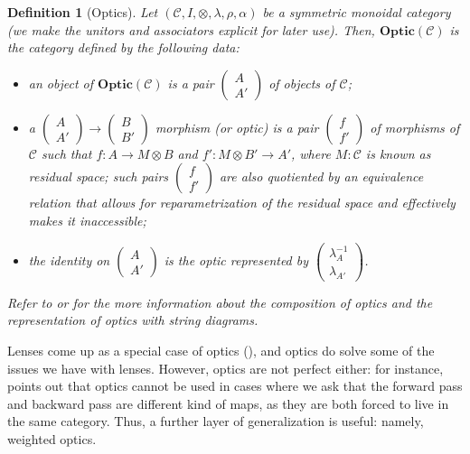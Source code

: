 \documentclass[11pt,a4paper,openright,twoside]{report}
\newcounter{mycounter}
\theoremstyle{plain}
\newtheorem{definition}[mycounter]{Definition}
\theoremstyle{definition}
\begin{document}
\begin{definition}[Optics]
  Let $(\mathcal{C}, I, \otimes, \lambda, \rho, \alpha)$ be a symmetric monoidal category (we make the unitors and associators explicit for later use). Then, $\mathbf{Optic}(\mathcal{C})$ is the category defined by the following data:
  \begin{itemize}
    \item an object of $\mathbf{Optic}(\mathcal{C})$ is a pair $\left(\begin{smallmatrix} A \\ A' \end{smallmatrix}\right)$ of objects of $\mathcal{C}$; 
    \item a $\left(\begin{smallmatrix} A \\ A' \end{smallmatrix}\right) \to \left(\begin{smallmatrix} B \\ B' \end{smallmatrix}\right)$ morphism (or optic) is a pair $\left(\begin{smallmatrix} f \\ f' \end{smallmatrix}\right)$ of morphisms of $\mathcal{C}$ such that $f: A \to M \otimes B$ and $f': M \otimes B' \to A'$, where $M : \mathcal{C}$ is known as residual space; such pairs $\left(\begin{smallmatrix} f \\ f' \end{smallmatrix}\right)$ are also quotiented by an equivalence relation that allows for reparametrization of the residual space and effectively makes it inaccessible;
    \item the identity on $\left(\begin{smallmatrix} A \\ A' \end{smallmatrix}\right)$ is the optic represented by $\left(\begin{smallmatrix}\lambda_A^{-1}\\ \lambda_{A'}\end{smallmatrix}\right)$.
  \end{itemize}
  Refer to \cite{riley2018categories} or \cite{gavranovic2024fundamental} for the more information about the composition of optics and the representation of optics with string diagrams.
\end{definition}

Lenses come up as a special case of optics (\cite{riley2018categories}), and optics do solve some of the issues we have with lenses. However, optics are not perfect either: for instance, \cite{gavranovic2024fundamental} points out that optics cannot be used in cases where we ask that the forward pass and backward pass are different kind of maps, as they are both forced to live in the same category. Thus, a further layer of generalization is useful: namely, weighted optics.
\end{document}
